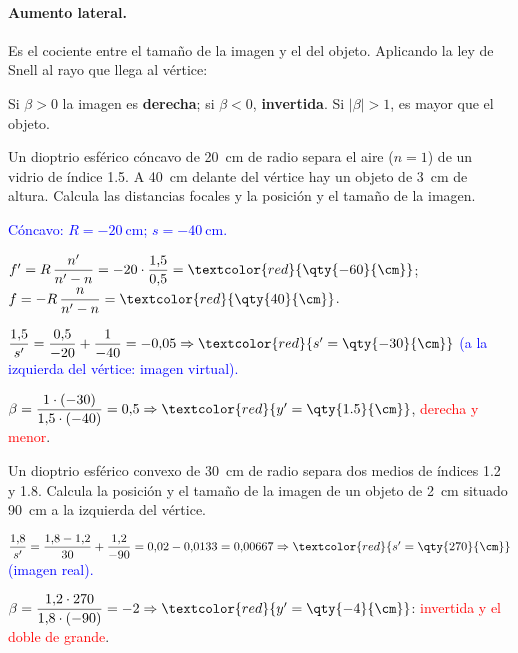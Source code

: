 \paragraph{Aumento lateral.} Es el cociente entre el tamaño de la imagen y el del objeto. Aplicando la ley de Snell al rayo
que llega al vértice:
\begin{centeredequation}
     \label{eq:opt-aumento-dioptrio}
\end{centeredequation}
Si \(\beta > 0\) la imagen es \textbf{derecha}; si \(\beta < 0\), \textbf{invertida}. Si \(|\beta| > 1\), es mayor que el objeto.

\begin{exercise}
    Un dioptrio esférico cóncavo de \qty{20}{\cm} de radio separa el aire (\(n = 1\)) de un vidrio de índice \num{1.5}. A
    \qty{40}{\cm} delante del vértice hay un objeto de \qty{3}{\cm} de altura. Calcula las distancias focales y la posición
    y el tamaño de la imagen.
    \begin{solu}
        \textcolor{blue}{Cóncavo: \(R = \qty{-20}{\cm}\); \(s = \qty{-40}{\cm}\).}

        \(f' = R\,\dfrac{n'}{n' - n} = -20\cdot\dfrac{1{,}5}{0{,}5} = \textcolor{red}{\qty{-60}{\cm}}\);
        \(f = -R\,\dfrac{n}{n' - n} = \textcolor{red}{\qty{40}{\cm}}\).

        \(\dfrac{1{,}5}{s'} = \dfrac{0{,}5}{-20} + \dfrac{1}{-40} = -0{,}05 \Rightarrow \textcolor{red}{s' = \qty{-30}{\cm}}\)
        \textcolor{blue}{(a la izquierda del vértice: imagen virtual).}

        \(\beta = \dfrac{1\cdot(-30)}{1{,}5\cdot(-40)} = 0{,}5 \Rightarrow \textcolor{red}{y' = \qty{1.5}{\cm}}\), \textcolor{red}{derecha y menor}.
    \end{solu}
\end{exercise}

\begin{exercise}
    Un dioptrio esférico convexo de \qty{30}{\cm} de radio separa dos medios de índices \num{1.2} y \num{1.8}. Calcula la
    posición y el tamaño de la imagen de un objeto de \qty{2}{\cm} situado \qty{90}{\cm} a la izquierda del vértice.
    \begin{solu}
        \(\dfrac{1{,}8}{s'} = \dfrac{1{,}8 - 1{,}2}{30} + \dfrac{1{,}2}{-90} = 0{,}02 - 0{,}0133 = 0{,}00667 \Rightarrow \textcolor{red}{s' = \qty{270}{\cm}}\)
        \textcolor{blue}{(imagen real).}

        \(\beta = \dfrac{1{,}2\cdot 270}{1{,}8\cdot(-90)} = -2 \Rightarrow \textcolor{red}{y' = \qty{-4}{\cm}}\): \textcolor{red}{invertida y el doble de grande}.
    \end{solu}
\end{exercise}

